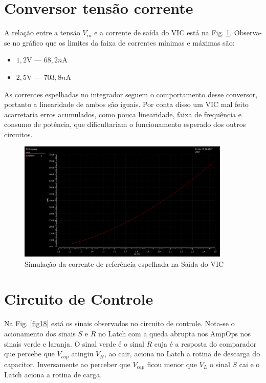 \section{Conversor tensão corrente}

A relação entre a tensão $V_{in}$ e a corrente de saída do VIC está na Fig. \ref{fig17}. Observa-se no gráfico que os limites da faixa de correntes mínimas e máximas são:
\begin{itemize}
\item $1,2$V	 \----	$68,2n$A
\item $2,5$V \----	$703,8n$A
\end{itemize}

As correntes espelhadas no integrador seguem o comportamento desse conversor, portanto a linearidade de ambos são iguais. Por conta disso um VIC mal feito acarretaria erros acumulados, como pouca linearidade, faixa de frequência e consumo de potência, que dificultariam o funcionamento esperado dos outros circuitos.


\begin{figure}[htb]
	\centering
	\includegraphics[width=0.9\textwidth]{figuras/sim_VIC.png}
	\caption{ Simulação da corrente de referência espelhada na Saída do VIC }
	\label{fig17}
\end{figure}

\section{Circuito de Controle}

Na Fig. \ref{fig18} está os sinais observados no circuito de controle. Nota-se o acionamento dos sinais $S$ e $R$ no Latch com a queda abrupta nos AmpOps nos sinais verde e laranja. O sinal verde é o sinal $R$ cuja é a resposta do comparador que percebe que $V_{cap}$ atingiu $V_H$, ao cair, aciona no Latch a rotina de descarga do capacitor. Inversamente ao perceber que $V_{cap}$ ficou menor que $V_L$ o sinal $S$ cai e o Latch aciona a rotina de carga.

